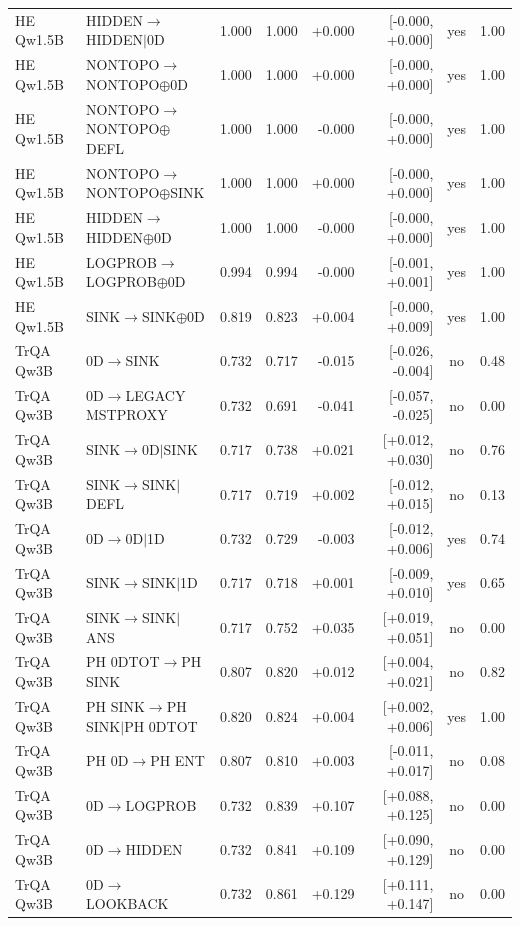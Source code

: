 \begin{longtable}{llrrrrcc}
HE Qw1.5B & HIDDEN$\to$HIDDEN$\mid$0D & 1.000 & 1.000 & +0.000 & [-0.000, +0.000] & yes & 1.00 \\
HE Qw1.5B & NONTOPO$\to$NONTOPO$\oplus$0D & 1.000 & 1.000 & +0.000 & [-0.000, +0.000] & yes & 1.00 \\
HE Qw1.5B & NONTOPO$\to$NONTOPO$\oplus$DEFL & 1.000 & 1.000 & -0.000 & [-0.000, +0.000] & yes & 1.00 \\
HE Qw1.5B & NONTOPO$\to$NONTOPO$\oplus$SINK & 1.000 & 1.000 & +0.000 & [-0.000, +0.000] & yes & 1.00 \\
HE Qw1.5B & HIDDEN$\to$HIDDEN$\oplus$0D & 1.000 & 1.000 & -0.000 & [-0.000, +0.000] & yes & 1.00 \\
HE Qw1.5B & LOGPROB$\to$LOGPROB$\oplus$0D & 0.994 & 0.994 & -0.000 & [-0.001, +0.001] & yes & 1.00 \\
HE Qw1.5B & SINK$\to$SINK$\oplus$0D & 0.819 & 0.823 & +0.004 & [-0.000, +0.009] & yes & 1.00 \\
TrQA Qw3B & 0D$\to$SINK & 0.732 & 0.717 & -0.015 & [-0.026, -0.004] & no & 0.48 \\
TrQA Qw3B & 0D$\to$LEGACY MSTPROXY & 0.732 & 0.691 & -0.041 & [-0.057, -0.025] & no & 0.00 \\
TrQA Qw3B & SINK$\to$0D$\mid$SINK & 0.717 & 0.738 & +0.021 & [+0.012, +0.030] & no & 0.76 \\
TrQA Qw3B & SINK$\to$SINK$\mid$DEFL & 0.717 & 0.719 & +0.002 & [-0.012, +0.015] & no & 0.13 \\
TrQA Qw3B & 0D$\to$0D$\mid$1D & 0.732 & 0.729 & -0.003 & [-0.012, +0.006] & yes & 0.74 \\
TrQA Qw3B & SINK$\to$SINK$\mid$1D & 0.717 & 0.718 & +0.001 & [-0.009, +0.010] & yes & 0.65 \\
TrQA Qw3B & SINK$\to$SINK$\mid$ANS & 0.717 & 0.752 & +0.035 & [+0.019, +0.051] & no & 0.00 \\
TrQA Qw3B & PH 0DTOT$\to$PH SINK & 0.807 & 0.820 & +0.012 & [+0.004, +0.021] & no & 0.82 \\
TrQA Qw3B & PH SINK$\to$PH SINK$\mid$PH 0DTOT & 0.820 & 0.824 & +0.004 & [+0.002, +0.006] & yes & 1.00 \\
TrQA Qw3B & PH 0D$\to$PH ENT & 0.807 & 0.810 & +0.003 & [-0.011, +0.017] & no & 0.08 \\
TrQA Qw3B & 0D$\to$LOGPROB & 0.732 & 0.839 & +0.107 & [+0.088, +0.125] & no & 0.00 \\
TrQA Qw3B & 0D$\to$HIDDEN & 0.732 & 0.841 & +0.109 & [+0.090, +0.129] & no & 0.00 \\
TrQA Qw3B & 0D$\to$LOOKBACK & 0.732 & 0.861 & +0.129 & [+0.111, +0.147] & no & 0.00 \\

\end{longtable}
